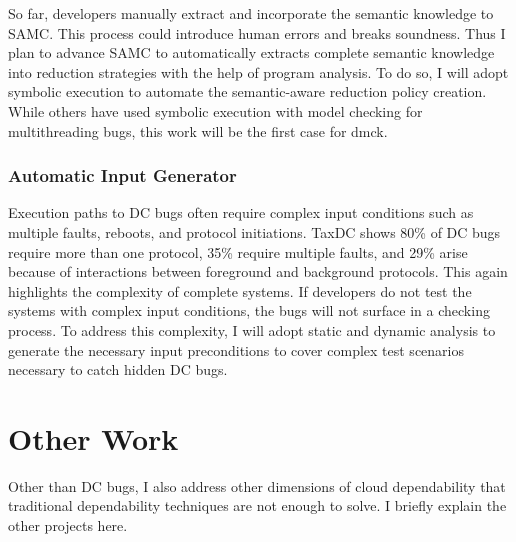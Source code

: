 \documentclass[10pt]{article}
\begin{document}
So far, developers manually extract and incorporate the semantic knowledge to
SAMC. This process could introduce human errors and breaks soundness. Thus I
plan to advance SAMC to automatically extracts complete semantic knowledge into
reduction strategies with the help of program analysis. To do so, I will adopt
symbolic execution to automate the semantic-aware reduction policy creation.
While others have used symbolic execution with model checking for
multithreading bugs, this work will be the first case for dmck. 

\subsubsection*{Automatic Input Generator}

Execution paths to DC bugs often require complex input conditions such as
multiple faults, reboots, and protocol initiations. TaxDC shows 80\% of DC bugs
require more than one protocol, 35\% require multiple faults, and 29\% arise
because of interactions between foreground and background protocols. This again
highlights the complexity of complete systems. 
If developers do not test the systems with complex input conditions, the bugs
will not surface in a checking process. To address this complexity, I will adopt
static and dynamic analysis to generate the necessary input preconditions to
cover complex test scenarios necessary to catch hidden DC bugs.

\section{Other Work}

Other than DC bugs, I also address other dimensions of cloud dependability that
traditional dependability techniques are not enough to solve. I briefly explain
the other projects here.

%

\end{document}
